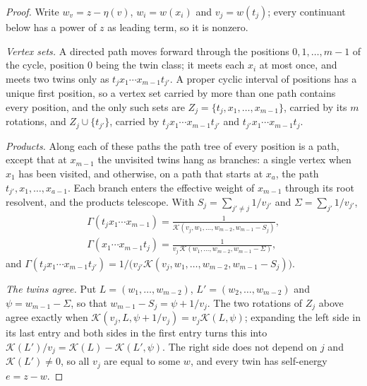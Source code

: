 \documentclass[final]{siamart0516}
\numberwithin{theorem}{section}
\numberwithin{equation}{section}
\theoremstyle{siamnonum}
\theoremstyle{plain}
\newcommand{\cont}{\mathcal{K}}           %
\begin{document}
\begin{proof}
Write $w_v=z-\eta(v)$, $w_i=w(x_i)$ and $v_j=w(t_j)$; every continuant below has a power of $z$ as leading term, so it is nonzero.

\emph{Vertex sets.} A directed path moves forward through the positions $0,1,\dots,m-1$ of the cycle, position $0$ being the twin class; it meets each $x_i$ at most once, and meets two twins only as $t_jx_1\cdots x_{m-1}t_{j'}$. A proper cyclic interval of positions has a unique first position, so a vertex set carried by more than one path contains every position, and the only such sets are $Z_j=\{t_j,x_1,\dots,x_{m-1}\}$, carried by its $m$ rotations, and $Z_j\cup\{t_{j'}\}$, carried by $t_jx_1\cdots x_{m-1}t_{j'}$ and $t_{j'}x_1\cdots x_{m-1}t_j$.

\emph{Products.} Along each of these paths the path tree of every position is a path, except that at $x_{m-1}$ the unvisited twins hang as branches: a single vertex when $x_1$ has been visited, and otherwise, on a path that starts at $x_a$, the path $t_{j'},x_1,\dots,x_{a-1}$. Each branch enters the effective weight of $x_{m-1}$ through its root resolvent, and the products telescope. With $S_j=\sum_{j'\neq j}1/v_{j'}$ and $\Sigma=\sum_{j'}1/v_{j'}$,
\begin{gather*}
\Gamma(t_jx_1\cdots x_{m-1})=\frac{1}{\cont(v_j,w_1,\dots,w_{m-2},w_{m-1}-S_j)},\\
\Gamma(x_1\cdots x_{m-1}t_j)=\frac{1}{v_j\,\cont(w_1,\dots,w_{m-2},w_{m-1}-\Sigma)},
\end{gather*}
and $\Gamma(t_jx_1\cdots x_{m-1}t_{j'})=1/\bigl(v_{j'}\cont(v_j,w_1,\dots,w_{m-2},w_{m-1}-S_j)\bigr)$.

\emph{The twins agree.} Put $L=(w_1,\dots,w_{m-2})$, $L'=(w_2,\dots,w_{m-2})$ and $\psi=w_{m-1}-\Sigma$, so that $w_{m-1}-S_j=\psi+1/v_j$. The two rotations of $Z_j$ above agree exactly when $\cont(v_j,L,\psi+1/v_j)=v_j\cont(L,\psi)$; expanding the left side in its last entry and both sides in the first entry turns this into $\cont(L')/v_j=\cont(L)-\cont(L',\psi)$. The right side does not depend on $j$ and $\cont(L')\neq0$, so all $v_j$ are equal to some $w$, and every twin has self-energy $e=z-w$.


\end{proof}
\end{document}

